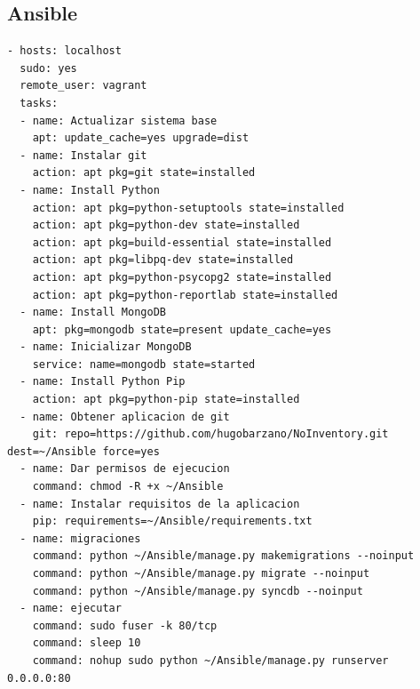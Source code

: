 \documentclass[a4paper,11pt]{book}
\begin{document}
\subsection{Ansible}\label{sec:playbook}
\begin{lstlisting}
- hosts: localhost
  sudo: yes
  remote_user: vagrant
  tasks:
  - name: Actualizar sistema base
    apt: update_cache=yes upgrade=dist
  - name: Instalar git
    action: apt pkg=git state=installed
  - name: Install Python
    action: apt pkg=python-setuptools state=installed
    action: apt pkg=python-dev state=installed
    action: apt pkg=build-essential state=installed
    action: apt pkg=libpq-dev state=installed
    action: apt pkg=python-psycopg2 state=installed
    action: apt pkg=python-reportlab state=installed
  - name: Install MongoDB
    apt: pkg=mongodb state=present update_cache=yes
  - name: Inicializar MongoDB
    service: name=mongodb state=started
  - name: Install Python Pip
    action: apt pkg=python-pip state=installed
  - name: Obtener aplicacion de git
    git: repo=https://github.com/hugobarzano/NoInventory.git dest=~/Ansible force=yes
  - name: Dar permisos de ejecucion
    command: chmod -R +x ~/Ansible
  - name: Instalar requisitos de la aplicacion
    pip: requirements=~/Ansible/requirements.txt
  - name: migraciones
    command: python ~/Ansible/manage.py makemigrations --noinput
    command: python ~/Ansible/manage.py migrate --noinput
    command: python ~/Ansible/manage.py syncdb --noinput
  - name: ejecutar
    command: sudo fuser -k 80/tcp
    command: sleep 10
    command: nohup sudo python ~/Ansible/manage.py runserver 0.0.0.0:80
\end{lstlisting}
\end{document}
